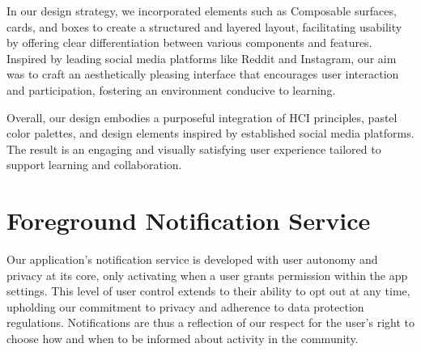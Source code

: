 In our design strategy, we incorporated elements such as Composable surfaces, cards, and boxes to create a structured and layered layout, facilitating usability by offering clear differentiation between various components and features. Inspired by leading social media platforms like Reddit and Instagram, our aim was to craft an aesthetically pleasing interface that encourages user interaction and participation, fostering an environment conducive to learning.

Overall, our design embodies a purposeful integration of HCI principles, pastel color palettes, and design elements inspired by established social media platforms. The result is an engaging and visually satisfying user experience tailored to support learning and collaboration.


\section{Foreground Notification Service}



Our application's notification service is developed with user autonomy and privacy at its core, only activating when a user grants permission within the app settings. This level of user control extends to their ability to opt out at any time, upholding our commitment to privacy and adherence to data protection regulations. Notifications are thus a reflection of our respect for the user's right to choose how and when to be informed about activity in the community.

